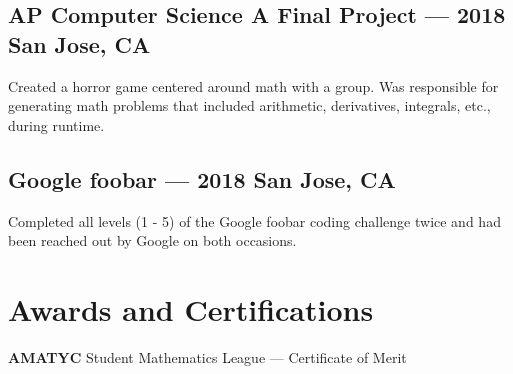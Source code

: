 \documentclass[letterpaper,12pt]{article}
\begin{document}
	\subsection{AP Computer Science A Final Project --- 2018 \null\hfill San Jose, CA}
	\par Created a horror game centered around math with a group. Was responsible for generating math problems that included arithmetic, derivatives, integrals, etc., during runtime.
	\vspace*{-2mm}
	\subsection{Google foobar --- 2018 \null\hfill San Jose, CA}
	\par Completed all levels (1 - 5) of the Google foobar coding challenge twice and had been reached out by Google on both occasions.
\section{Awards and Certifications}
	{\bfseries AMATYC} Student Mathematics League --- Certificate of Merit
\end{document}
